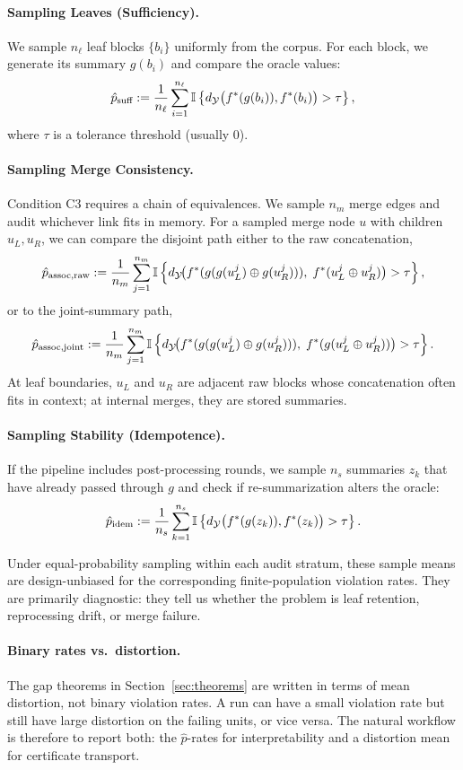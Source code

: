 \paragraph{Sampling Leaves (Sufficiency).}
We sample $n_\ell$ leaf blocks $\{b_i\}$ uniformly from the corpus. For each block, we generate its summary $g(b_i)$ and compare the oracle values:
\[
\hat{p}_{\text{suff}} := \frac{1}{n_\ell} \sum_{i=1}^{n_\ell} \mathbb{I}\left\{ d_{\mathcal{Y}}\big(f^\ast(g(b_i)), f^\ast(b_i)\big) > \tau \right\},
\]
where $\tau$ is a tolerance threshold (usually 0).

\paragraph{Sampling Merge Consistency.}
Condition C3 requires a chain of equivalences. We sample $n_m$ merge edges and audit whichever link fits in memory. For a sampled merge node $u$ with children $u_L, u_R$, we can compare the disjoint path either to the raw concatenation,
\[
\hat{p}_{\text{assoc,raw}} := \frac{1}{n_m} \sum_{j=1}^{n_m} \mathbb{I}\left\{ d_{\mathcal{Y}}\!\big(f^\ast(g(g(u_L^j) \oplus g(u_R^j))),\; f^\ast(u_L^j \oplus u_R^j)\big) > \tau \right\},
\]
or to the joint-summary path,
\[
\hat{p}_{\text{assoc,joint}} := \frac{1}{n_m} \sum_{j=1}^{n_m} \mathbb{I}\left\{ d_{\mathcal{Y}}\!\big(f^\ast(g(g(u_L^j) \oplus g(u_R^j))),\; f^\ast(g(u_L^j \oplus u_R^j))\big) > \tau \right\}.
\]
At leaf boundaries, $u_L$ and $u_R$ are adjacent raw blocks whose concatenation often fits in context; at internal merges, they are stored summaries.

\paragraph{Sampling Stability (Idempotence).}
If the pipeline includes post-processing rounds, we sample $n_s$ summaries $z_k$ that have already passed through $g$ and check if re-summarization alters the oracle:
\[
\hat{p}_{\text{idem}} := \frac{1}{n_s} \sum_{k=1}^{n_s} \mathbb{I}\left\{ d_{\mathcal{Y}}\big(f^\ast(g(z_k)), f^\ast(z_k)\big) > \tau \right\}.
\]

Under equal-probability sampling within each audit stratum, these sample means are design-unbiased for the corresponding finite-population violation rates. They are primarily diagnostic: they tell us whether the problem is leaf retention, reprocessing drift, or merge failure.

\paragraph{Binary rates vs.\ distortion.}
The gap theorems in Section~\ref{sec:theorems} are written in terms of mean distortion, not binary violation rates. A run can have a small violation rate but still have large distortion on the failing units, or vice versa. The natural workflow is therefore to report both: the $\hat{p}$-rates for interpretability and a distortion mean for certificate transport.

